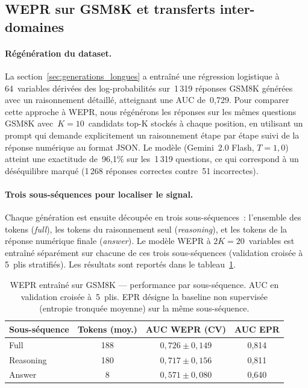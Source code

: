 \subsection{WEPR sur GSM8K et transferts inter-domaines}
\label{sec:transfert_wepr}

\paragraph{Régénération du dataset.}
La section~\ref{sec:generations_longues} a entraîné une régression
logistique à 64~variables dérivées des log-probabilités sur~1\,319
réponses GSM8K générées avec un raisonnement détaillé, atteignant une
AUC de~0,729. Pour comparer cette approche à WEPR, nous régénérons les
réponses sur les mêmes questions GSM8K avec~$K=10$~candidats top-K
stockés à chaque position, en utilisant un prompt qui demande
explicitement un raisonnement étape par étape suivi de la réponse
numérique au format JSON. Le modèle (Gemini~2.0 Flash, $T=1{,}0$)
atteint une exactitude de~96{,}1\% sur les~1\,319 questions, ce qui
correspond à un déséquilibre marqué (1\,268 réponses correctes
contre~51 incorrectes).

\paragraph{Trois sous-séquences pour localiser le signal.}
Chaque génération est ensuite découpée en trois sous-séquences~:
l'ensemble des tokens (\emph{full}), les tokens du raisonnement seul
(\emph{reasoning}), et les tokens de la réponse numérique finale
(\emph{answer}). Le modèle WEPR à $2K=20$~variables est entraîné
séparément sur chacune de ces trois sous-séquences (validation croisée
à 5~plis stratifiés). Les résultats sont reportés dans le
tableau~\ref{tab:wepr_gsm_subseq}.

\begin{table}[H]
\centering
\caption{WEPR entraîné sur GSM8K — performance par sous-séquence.
AUC en validation croisée à~5~plis. EPR désigne la baseline non
supervisée (entropie tronquée moyenne) sur la même sous-séquence.}
\label{tab:wepr_gsm_subseq}
\begin{tabular}{lccc}
\toprule
Sous-séquence & Tokens (moy.) & AUC WEPR (CV) & AUC EPR \\
\midrule
Full      & 188 & $0{,}726 \pm 0{,}149$ & 0{,}814 \\
Reasoning & 180 & $0{,}717 \pm 0{,}156$ & 0{,}811 \\
Answer    &   8 & $0{,}571 \pm 0{,}080$ & 0{,}640 \\
\bottomrule
\end{tabular}
\end{table}

